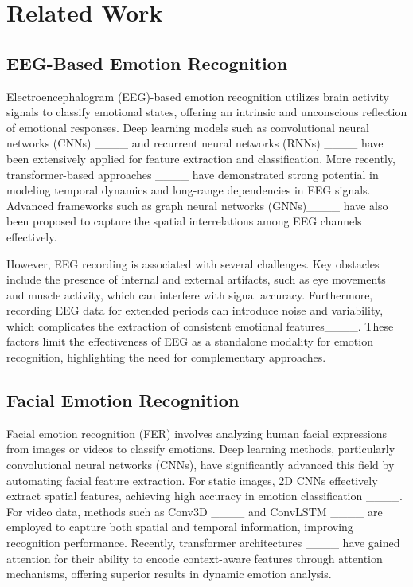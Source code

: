 \section{Related Work\label{sec:section2}
}

\subsection{EEG-Based Emotion Recognition}
Electroencephalogram (EEG)-based emotion recognition utilizes brain activity signals to classify emotional states, offering an intrinsic and unconscious reflection of emotional responses. Deep learning models such as convolutional neural networks (CNNs) ____ and recurrent neural networks (RNNs) ____ have been extensively applied for feature extraction and classification. More recently, transformer-based approaches ____ have demonstrated strong potential in modeling temporal dynamics and long-range dependencies in EEG signals. Advanced frameworks such as graph neural networks (GNNs)____ have also been proposed to capture the spatial interrelations among EEG channels effectively.

However, EEG recording is associated with several challenges. Key obstacles include the presence of internal and external artifacts, such as eye movements and muscle activity, which can interfere with signal accuracy. Furthermore, recording EEG data for extended periods can introduce noise and variability, which complicates the extraction of consistent emotional features____. These factors limit the effectiveness of EEG as a standalone modality for emotion recognition, highlighting the need for complementary approaches.

\subsection{Facial Emotion Recognition}
Facial emotion recognition (FER) involves analyzing human facial expressions from images or videos to classify emotions. Deep learning methods, particularly convolutional neural networks (CNNs), have significantly advanced this field by automating facial feature extraction. For static images, 2D CNNs effectively extract spatial features, achieving high accuracy in emotion classification ____. For video data, methods such as Conv3D ____ and ConvLSTM ____ are employed to capture both spatial and temporal information, improving recognition performance. Recently, transformer architectures ____ have gained attention for their ability to encode context-aware features through attention mechanisms, offering superior results in dynamic emotion analysis.

